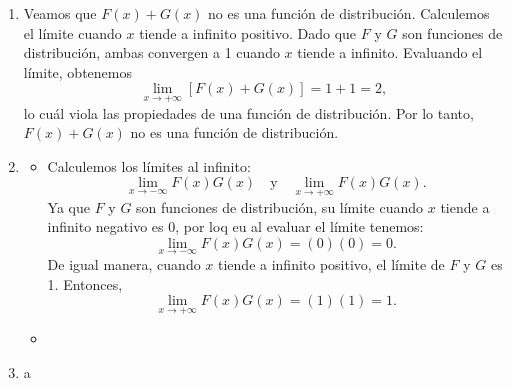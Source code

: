 \documentclass{article}
\begin{document}
\begin{enumerate}
\begin{enumerate}[label={(\roman*)}]
        Consideremos \(a \in (0, 1)\) y verifiquemos las propiedades de la función.
        \begin{itemize}
            \item Calculemos los límites al infinito: 
            \[
            \lim_{x \to -\infty} aF(x) + (1 - a)G(x) \quad \text{y} \lim_{x \to +\infty} aF(x) + (1 - a)G(x).
            \]
            Ya que \(F\) y \(G\) son funciones de distribución, su límite cuando \(x\) tiende a infinito negativo es 0, por lo que al evaluar el límite tenemos:
            \[
            \lim_{x \to -\infty} aF(x) + (1 - a)G(x) = a(0) + (1 - a)(0) = 0.
            \]
            Análogamente, cuando \(x\) tiende a infinito positivo, el límite de \(F\) y \(G\) es 1. Por lo tanto,
            \[
            \lim_{x \to +\infty} aF(x) + (1 - a)G(x) = a(1) + (1 - a)(1) = a + 1 - a = 1.
            \]
            \item Dado que \(a \geq 0\), entonces la monotonicidad del primer término \(aF(x)\) es igual a la de \(F(x)\), que es creciente por hipótesis. De forma similar, como \(a \leq 1\), entonces \((1 - a) \geq 0\), por lo que el término \((1 - a)G(x)\) es creciente también. Dado que la suma de funciones crecientes es creciente, se sigue que la función \(aF(x) + (1 - a)G(x)\) es creciente.
            \item Ya que hemos probado que la función es creciente y su valor en sus límites es 0 y 1, se sigue que 
            \[
            0 \leq aF(x) + (1 - a)G(x) \leq 1.
            \]
        \end{itemize}
        Como hemos verificado las propiedades, entonces la función \(aF(x) + (1 - a)G(x)\) es una función de distribución.
        \item Veamos que \(F(x) + G(x)\) no es una función de distribución. Calculemos el límite cuando \(x\) tiende a infinito positivo. Dado que \(F\) y \(G\) son funciones de distribución, ambas convergen a 1 cuando \(x\) tiende a infinito. Evaluando el límite, obtenemos 
    \[
    \lim_{x \to +\infty} [F(x) + G(x)] = 1 + 1 = 2,
    \]
    lo cuál viola las propiedades de una función de distribución. Por lo tanto, \(F(x) + G(x)\) no es una función de distribución.
    \item \begin{itemize}
        \item Calculemos los límites al infinito:
        \[
        \lim_{x \to -\infty}F(x)G(x) \quad \text{y} \quad \lim_{x \to +\infty} F(x)G(x).
        \]
        Ya que \(F\) y \(G\) son funciones de distribución, su límite cuando \(x\) tiende a infinito negativo es 0, por loq eu al evaluar el límite tenemos:
        \[
        \lim_{x \to -\infty}F(x)G(x) = (0)(0) = 0.
        \]
        De igual manera, cuando \(x\) tiende a infinito positivo, el límite de \(F\) y \(G\) es 1. Entonces,
        \[
        \lim_{x \to +\infty}F(x)G(x) = (1)(1) = 1.
        \]
        \item 
    \end{itemize}
    \item a
\end{enumerate}
\end{enumerate}
\end{document}
